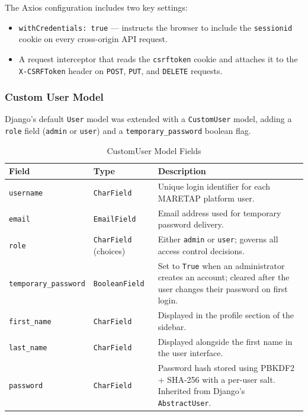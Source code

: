 \begin{sloppypar}
The Axios configuration includes two key settings:

\begin{itemize}
  \item \texttt{withCredentials:~true} --- instructs the browser to include the
    \texttt{sessionid} cookie on every cross-origin API request.
  \item A request interceptor that reads the \texttt{csrftoken} cookie and
    attaches it to the \texttt{X-CSRFToken} header on \texttt{POST},
    \texttt{PUT}, and \texttt{DELETE} requests.
\end{itemize}

\subsubsection{Custom User Model}

Django's default \texttt{User} model was extended with a \texttt{CustomUser}
model, adding a \texttt{role} field (\texttt{admin} or \texttt{user}) and a
\texttt{temporary\_password} boolean flag.

\begin{table}[H]
\centering
\caption{CustomUser Model Fields}
\label{tab:custom_user}
\renewcommand{\arraystretch}{1.5}
\begin{tabular}{|l|l|p{7cm}|}
\hline
\rowcolor{blue!20}
\textbf{Field} & \textbf{Type} & \textbf{Description} \\
\hline
\texttt{username} & \texttt{CharField} &
  Unique login identifier for each MARETAP platform user. \\
\hline
\rowcolor{gray!10}
\texttt{email} & \texttt{EmailField} &
  Email address used for temporary password delivery. \\
\hline
\texttt{role} & \texttt{CharField} (choices) &
  Either \texttt{admin} or \texttt{user}; governs all access control
  decisions. \\
\hline
\rowcolor{gray!10}
\texttt{temporary\_password} & \texttt{BooleanField} &
  Set to \texttt{True} when an administrator creates an account; cleared
  after the user changes their password on first login. \\
\hline
\texttt{first\_name} & \texttt{CharField} &
  Displayed in the profile section of the sidebar. \\
\hline
\rowcolor{gray!10}
\texttt{last\_name} & \texttt{CharField} &
  Displayed alongside the first name in the user interface. \\
\hline
\texttt{password} & \texttt{CharField} &
  Password hash stored using PBKDF2 + SHA-256 with a per-user salt.
  Inherited from Django's \texttt{AbstractUser}. \\
\hline
\end{tabular}
\end{table}


\end{sloppypar}
